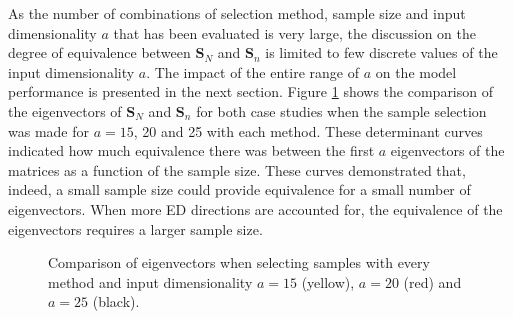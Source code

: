 \documentclass[journal=ancham,manuscript=article]{achemso}
\begin{document}
As the number of combinations of selection method, sample size and input dimensionality $a$ that has been evaluated is very large, the discussion on the degree of equivalence between $\mathbf{S}_N$ and $\mathbf{S}_n$ is limited to few discrete values of the input dimensionality $a$. The impact of the entire range of $a$ on the model performance is presented in the next section. Figure \ref{fig_specific_framework_detereigevect} shows the comparison of the eigenvectors of $\mathbf{S}_N$ and $\mathbf{S}_n$ for both case studies when the sample selection was made for $a=15$, 20 and 25 with each method. These determinant curves indicated how much equivalence there was between the first $a$ eigenvectors of the matrices as a function of the sample size. These curves demonstrated that, indeed, a small sample size could provide equivalence for a small number of eigenvectors. When more ED directions are accounted for, the equivalence of the eigenvectors requires a larger sample size. 


\begin{figure}[H]
    \centering
    \caption{Comparison of eigenvectors when selecting samples with every method and input dimensionality $a=15$ (yellow), $a=20$ (red) and $a=25$ (black).}
    \label{fig_specific_framework_detereigevect}
\end{figure}
\end{document}
